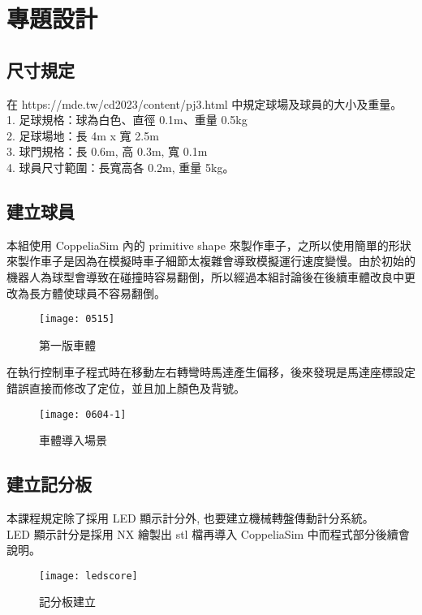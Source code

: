 \chapter{專題設計}
\renewcommand{\baselinestretch}{10.0} %
\setcounter{page}{2}  %
\fontsize{14pt}{2.5pt}\sectionef

\section{尺寸規定}
在 https://mde.tw/cd2023/content/pj3.html 中規定球場及球員的大小及重量。\\
1. 足球規格：球為白色、直徑 0.1m、重量 0.5kg\\
2. 足球場地：長 4m x 寬 2.5m\\
3. 球門規格：長 0.6m, 高 0.3m, 寬 0.1m\\
4. 球員尺寸範圍：長寬高各 0.2m, 重量 5kg。\\

\section{建立球員}
本組使用 CoppeliaSim 內的 primitive shape 來製作車子，之所以使用簡單的形狀來製作車子是因為在模擬時車子細節太複雜會導致模擬運行速度變慢。由於初始的機器人為球型會導致在碰撞時容易翻倒，所以經過本組討論後在後續車體改良中更改為長方體使球員不容易翻倒。\\
\begin{figure}[hbt!]
\begin{center}
\texttt{[image: 0515]}
\caption{\Large 第一版車體}\label{車體}
\end{center}
\end{figure}

在執行控制車子程式時在移動左右轉彎時馬達產生偏移，後來發現是馬達座標設定錯誤直接而修改了定位，並且加上顏色及背號。\\
\begin{figure}[hbt!]
\begin{center}
\texttt{[image: 0604-1]}
\caption{\Large 車體導入場景}\label{車體導入場景}
\end{center}
\end{figure}

\section{建立記分板}
本課程規定除了採用 LED 顯示計分外, 也要建立機械轉盤傳動計分系統。\\
LED 顯示計分是採用 NX 繪製出 stl 檔再導入 CoppeliaSim 中而程式部分後續會說明。\\
\begin{figure}[hbt!]
\begin{center}
\texttt{[image: ledscore]}
\caption{\Large 記分板建立}\label{記分板建立}
\end{center}
\end{figure}

